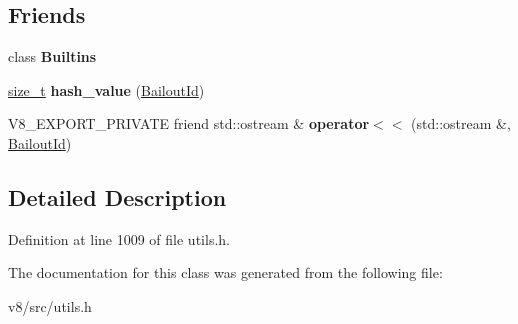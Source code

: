 \subsection*{Friends}
\begin{DoxyCompactItemize}
\item 
\mbox{\label{classv8_1_1internal_1_1BailoutId_afb9273054bbf7171a46b35cebb4d4b34}} 
class {\bfseries Builtins}
\item 
\mbox{\label{classv8_1_1internal_1_1BailoutId_abd47c7473aac8fb7ceacb1bf92be7efa}} 
\mbox{\hyperlink{classsize__t}{size\+\_\+t}} {\bfseries hash\+\_\+value} (\mbox{\hyperlink{classv8_1_1internal_1_1BailoutId}{Bailout\+Id}})
\item 
\mbox{\label{classv8_1_1internal_1_1BailoutId_a35812ff38e1563a6d2c9f75036c5fac6}} 
V8\+\_\+\+E\+X\+P\+O\+R\+T\+\_\+\+P\+R\+I\+V\+A\+TE friend std\+::ostream \& {\bfseries operator$<$$<$} (std\+::ostream \&, \mbox{\hyperlink{classv8_1_1internal_1_1BailoutId}{Bailout\+Id}})
\end{DoxyCompactItemize}


\subsection{Detailed Description}


Definition at line 1009 of file utils.\+h.



The documentation for this class was generated from the following file\+:\begin{DoxyCompactItemize}
\item 
v8/src/utils.\+h\end{DoxyCompactItemize}
